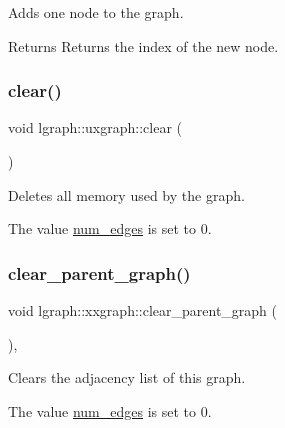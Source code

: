 Adds one node to the graph. 

\begin{DoxyReturn}{Returns}
Returns the index of the new node. 
\end{DoxyReturn}
\mbox{\label{classlgraph_1_1uxgraph_aad397c98fd1f144350e4418971319a97}} 
\subsubsection{\texorpdfstring{clear()}{clear()}}
{\footnotesize\ttfamily void lgraph\+::uxgraph\+::clear (\begin{DoxyParamCaption}{ }\end{DoxyParamCaption})\hspace{0.3cm}{\ttfamily [inherited]}}



Deletes all memory used by the graph. 

The value \hyperlink{classlgraph_1_1xxgraph_a6765a9a3be42f6e0f824635c593b35d7}{num\+\_\+edges} is set to 0. \mbox{\label{classlgraph_1_1xxgraph_a4122495066e4402cbf6d2d9bb82d54cc}} 
\subsubsection{\texorpdfstring{clear\+\_\+parent\+\_\+graph()}{clear\_parent\_graph()}}
{\footnotesize\ttfamily void lgraph\+::xxgraph\+::clear\+\_\+parent\+\_\+graph (\begin{DoxyParamCaption}{ }\end{DoxyParamCaption})\hspace{0.3cm}{\ttfamily [protected]}, {\ttfamily [inherited]}}



Clears the adjacency list of this graph. 

The value \hyperlink{classlgraph_1_1xxgraph_a6765a9a3be42f6e0f824635c593b35d7}{num\+\_\+edges} is set to 0. \mbox{\label{classlgraph_1_1xxgraph_a20ebc2927ee8fb8bb0a2c3b448d9ed78}} 
